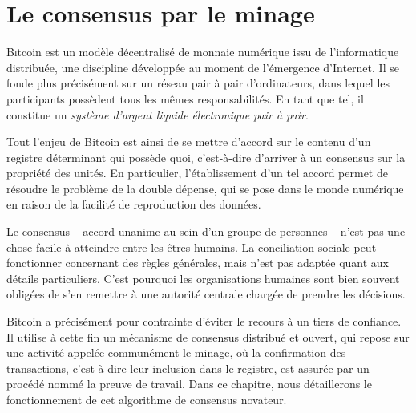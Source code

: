 
\chapter{Le consensus par le minage}
\label{ch:confirmation}
\label{enotezch:8}

\lettrine[]{B}itcoin est un modèle décentralisé de monnaie numérique issu de l'informatique distribuée, une discipline développée au moment de l'émergence d'Internet. Il se fonde plus précisément sur un réseau pair à pair d'ordinateurs, dans lequel les participants possèdent tous les mêmes responsabilités. En tant que tel, il constitue un \emph{système d'argent liquide électronique pair à pair}.

Tout l'enjeu de Bitcoin est ainsi de se mettre d'accord sur le contenu d'un registre déterminant qui possède quoi, c'est-à-dire d'arriver à un consensus sur la propriété des unités. En particulier, l'établissement d'un tel accord permet de résoudre le problème de la double dépense, qui se pose dans le monde numérique en raison de la facilité de reproduction des données.

Le consensus -- accord unanime au sein d'un groupe de personnes -- n'est pas une chose facile à atteindre entre les êtres humains. La conciliation sociale peut fonctionner concernant des règles générales, mais n'est pas adaptée quant aux détails particuliers. C'est pourquoi les organisations humaines sont bien souvent obligées de s'en remettre à une autorité centrale chargée de prendre les décisions.

Bitcoin a précisément pour contrainte d'éviter le recours à un tiers de confiance. Il utilise à cette fin un mécanisme de consensus distribué et ouvert, qui repose sur une activité appelée communément le minage, où la confirmation des transactions, c'est-à-dire leur inclusion dans le registre, est assurée par un procédé nommé la preuve de travail. Dans ce chapitre, nous détaillerons le fonctionnement de cet algorithme de consensus novateur.



